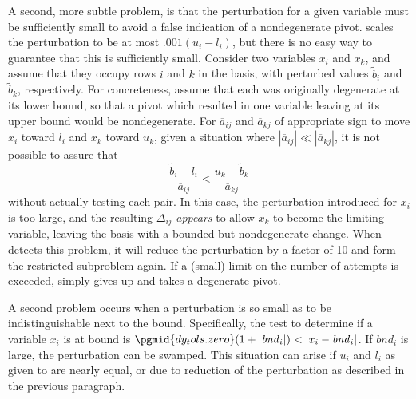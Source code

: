 A second, more subtle problem, is that the perturbation for a given variable
must be sufficiently small to avoid a false indication of a nondegenerate
pivot.
\dylp scales the perturbation to be at most $.001(u_i - l_i)$, but there is
no easy way to guarantee that this is sufficiently small.
Consider two variables $x_i$ and $x_k$, and assume that they occupy rows
$i$ and $k$ in the basis, with perturbed values
$\tilde{b}_i$ and $\tilde{b}_k$, respectively.
For concreteness, assume that each was originally degenerate at its lower
bound, so that a pivot which resulted in one variable leaving at its upper
bound would be nondegenerate.
For $\overline{a}_{ij}$ and $\overline{a}_{kj}$ of appropriate sign to move
$x_i$ toward $l_i$ and $x_k$ toward $u_k$, given a situation where
$|\overline{a}_{ij}| \ll |\overline{a}_{kj}|$, it is not possible to assure
that
\begin{displaymath}
\frac{\tilde{b}_i - l_i}{\overline{a}_{ij}} <
\frac{u_k - \tilde{b}_k}{\overline{a}_{kj}}
\end{displaymath}
without actually testing each pair.
In this case, the perturbation introduced for $x_i$ is too large, and the
resulting $\Delta_{ij}$ \textit{appears} to allow $x_k$ to become the limiting
variable, leaving the basis with a bounded but nondegenerate change.
When \dylp detects this problem, it will reduce the perturbation by a factor
of 10 and form the restricted subproblem again.
If a (small) limit on the number of attempts is exceeded, \dylp simply gives
up and takes a degenerate pivot.

A second problem occurs when a perturbation is so small as to be
indistinguishable next to the bound.
Specifically, the test to determine if a variable $x_i$ is at bound is
$\pgmid{dy_tols.zero}(1+|\mathit{bnd}_i|) < |x_i - \mathit{bnd}_i|$.
If $\mathit{bnd}_i$ is large, the perturbation can be swamped.
This situation can arise if $u_i$ and $l_i$ as given to \dylp are nearly equal,
or due to reduction of the perturbation as described in the previous
paragraph.

